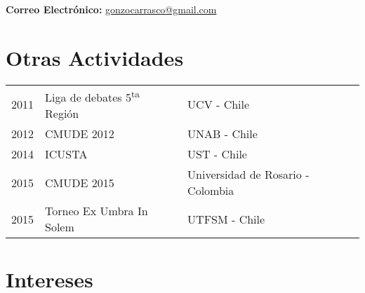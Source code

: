 \documentclass[letterpaper]{deedy-resume}
\begin{document}
\begin{minipage}[t]{0.66\textwidth}
{\bf Correo Electrónico:} 
\href{mailto:gonzocarrasco@gmail.com}{gonzocarrasco@gmail.com}
\sectionspace

\section{Otras Actividades} 
\parskip 5pt 

\begin{tabular}{rll}
    2011 & Liga de debates 5\textsuperscript{ta} Región  & UCV - Chile\\
    2012 & CMUDE 2012 & UNAB - Chile\\
    2014 & ICUSTA & UST - Chile\\
    2015 & CMUDE 2015 & Universidad de Rosario - Colombia\\
    2015 & Torneo Ex Umbra In Solem & UTFSM - Chile
\end{tabular}

\sectionspace 

\section{Intereses}


\end{minipage}
\end{document}
